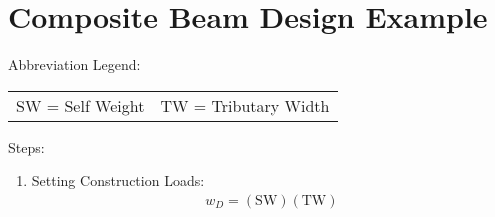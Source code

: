 \documentclass{report} %
\begin{document}
\newpage

\section*{Composite Beam Design Example}
Abbreviation Legend:
\begin{tabular}{ c c }
    SW = Self Weight & TW = Tributary Width 
\end{tabular}
Steps:
\begin{enumerate}
    \item Setting Construction Loads:
        \begin{equation*}
            \begin{aligned}
                w_D = (\text{SW}) (\text{TW})
            \end{aligned}
        \end{equation*}
\end{enumerate}
\end{document}
